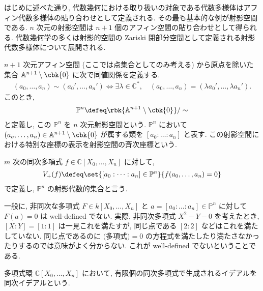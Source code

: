 \documentclass[openany, a4paper, oneside]{jsbook}
\begin{document}
はじめに述べた通り, 代数幾何における取り扱いの対象である代数多様体はアフィン代数多様体の貼り合わせとして定義される.
その最も基本的な例が射影空間である.
$n$ 次元の射影空間は $n+1$ 個のアフィン空間の貼り合わせとして得られる.
代数幾何学の多くは射影的空間の Zariski 閉部分空間として定義される射影代数多様体について展開される.
\begin{defn}[射影空間]\label{waheyhey-algebraic-geometry-guidance7}
$n+1$ 次元アフィン空間 (ここでは点集合としてのみ考える) から原点を除いた集合 $\mathbb{A}^{n+1} \setminus \cbk{0}$ に次で同値関係を定義する.
\begin{align}
 (a_0, \dots, a_n)
 \sim
 ( { a_0 }', \dots, { a_n }' )
 \Leftrightarrow
 \exists \lambda \in \mathbb{C}^*, \quad
 (a_0, \dots, a_n)
 =
 ( \lambda { a_0 }', \dots, \lambda { a_n }' ).
\end{align}
このとき,
\begin{align}
 \mathbb{P}^n
 \defeq
 \rbk{\mathbb{A}^{n+1} \setminus \cbk{0}} / \sim
\end{align}
と定義し, この $\mathbb{P}^n$ を $n$ 次元射影空間という.
$\mathbb{P}^n$ において $(a_o, \dots, a_n) \in \mathbb{A}^{n+1} \setminus \cbk{0}$ が属する類を
$[a_0 : \dots : a_n]$ と表す.
この射影空間における特別な座標の表示を射影空間の斉次座標という. \fin
\end{defn}
\begin{defn}[射影代数的集合]
$m$ 次の同次多項式 $f \in \mathbb{C}[X_0, \dots, X_n]$ に対して,
\begin{align}
 V_+ ( f )
 \defeq
 \set{[a_0 : \dots : a_n] \in \mathbb{P}^n}{f ( a_0, \dots, a_n ) = 0}
\end{align}
で定義し,  $\mathbb{P}^n$ の射影代数的集合と言う. \fin
\end{defn}
\begin{rem}
一般に, 非同次な多項式 $F \in k[X_0, \dots, X_n]$ と
$a=[a_0: \dots : a_n] \in \mathbb{P}^n$ に対して $F (a)=0$ は well-defined でない.
実際, 非同次多項式 $X^2-Y-0$ を考えたとき,
$[X:Y]=[1:1]$ は一見これを満たすが, 同じ点である $[2:2]$ などはこれを満たしていない.
同じ点であるのに $\text{(多項式)}=0$ の方程式を満たしたり満たさなかったりするのでは意味がよく分からない.
これが well-defined でないということである. \fin
\end{rem}

\begin{defn}[同次イデアル]
多項式環 $\mathbb{C}[X_0, \dots, X_n]$ において,
有限個の同次多項式で生成されるイデアルを同次イデアルという. \fin
\end{defn}
\end{document}

